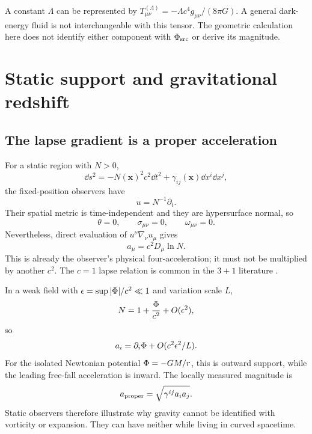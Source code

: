 \documentclass[11pt]{article}
\begin{document}
A constant $\Lambda$ can be represented by $T^{(\Lambda)}_{\mu\nu}=-\Lambda c^4g_{\mu\nu}/(8\pi G)$. A general dark-energy fluid is not interchangeable with this tensor. The geometric calculation here does not identify either component with $\Phi_{\mathrm{src}}$ or derive its magnitude.

\section{Static support and gravitational redshift}
\subsection{The lapse gradient is a proper acceleration}
For a static region with $N>0$,
\begin{equation}
\dd s^2=-N(\mathbf x)^2c^2\dd t^2+\gamma_{ij}(\mathbf x)\dd x^i\dd x^j,
\label{eq:staticmetric}
\end{equation}
the fixed-position observers have
\begin{equation}
u=N^{-1}\partial_t.
\label{eq:staticu}
\end{equation}
Their spatial metric is time-independent and they are hypersurface normal, so
\begin{equation}
\theta=0,\qquad \sigma_{\mu\nu}=0,\qquad \omega_{\mu\nu}=0.
\label{eq:statickinematics}
\end{equation}
Nevertheless, direct evaluation of $u^\nu\nabla_\nu u_\mu$ gives
\begin{equation}
\boxed{a_\mu=c^2D_\mu\ln N.}
\label{eq:staticacceleration}
\end{equation}
This is already the observer's physical four-acceleration; it must not be multiplied by another $c^2$. The $c=1$ lapse relation is common in the $3+1$ literature \parencite{Gourgoulhon2010}.

In a weak field with $\epsilon=\sup|\Phi|/c^2\ll1$ and variation scale $L$,
\begin{equation}
N=1+\frac{\Phi}{c^2}+O(\epsilon^2),
\label{eq:lapseweakfield}
\end{equation}
so
\begin{equation}
a_i=\partial_i\Phi+O(c^2\epsilon^2/L).
\label{eq:weakfieldacceleration}
\end{equation}
For the isolated Newtonian potential $\Phi=-GM/r$, this is outward support, while the leading free-fall acceleration is inward. The locally measured magnitude is
\begin{equation}
a_{\rm proper}=\sqrt{\gamma^{ij}a_i a_j}.
\label{eq:physicalacceleration}
\end{equation}
Static observers therefore illustrate why gravity cannot be identified with vorticity or expansion. They can have neither while living in curved spacetime.
\end{document}
